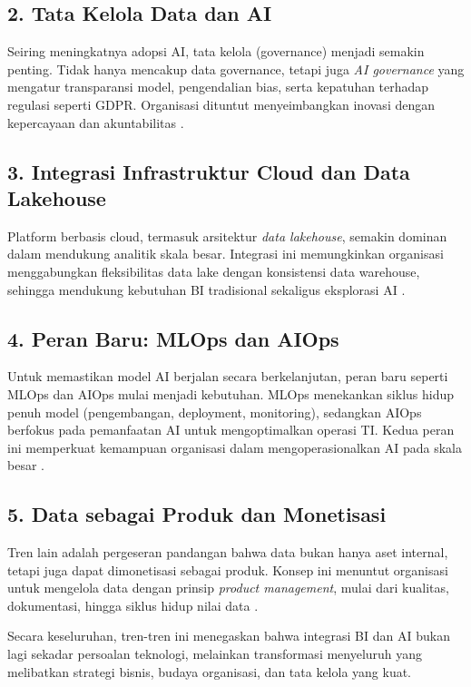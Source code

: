 \subsection*{2. Tata Kelola Data dan AI}
Seiring meningkatnya adopsi AI, tata kelola (governance) menjadi semakin penting. Tidak hanya mencakup 
data governance, tetapi juga \textit{AI governance} yang mengatur transparansi model, 
pengendalian bias, serta kepatuhan terhadap regulasi seperti GDPR. Organisasi dituntut menyeimbangkan 
inovasi dengan kepercayaan dan akuntabilitas \cite{khatri2010data, zwitter2014}.  

\subsection*{3. Integrasi Infrastruktur Cloud dan Data Lakehouse}
Platform berbasis cloud, termasuk arsitektur \textit{data lakehouse}, semakin dominan dalam mendukung 
analitik skala besar. Integrasi ini memungkinkan organisasi menggabungkan fleksibilitas data lake dengan 
konsistensi data warehouse, sehingga mendukung kebutuhan BI tradisional sekaligus eksplorasi AI 
\cite{armbrust2021lakehouse}.  

\subsection*{4. Peran Baru: MLOps dan AIOps}
Untuk memastikan model AI berjalan secara berkelanjutan, peran baru seperti MLOps dan AIOps mulai 
menjadi kebutuhan. MLOps menekankan siklus hidup penuh model (pengembangan, deployment, monitoring), 
sedangkan AIOps berfokus pada pemanfaatan AI untuk mengoptimalkan operasi TI. Kedua peran ini 
memperkuat kemampuan organisasi dalam mengoperasionalkan AI pada skala besar \cite{goyal2022}.  

\subsection*{5. Data sebagai Produk dan Monetisasi}
Tren lain adalah pergeseran pandangan bahwa data bukan hanya aset internal, tetapi juga dapat 
dimonetisasi sebagai produk. Konsep ini menuntut organisasi untuk mengelola data dengan prinsip 
\textit{product management}, mulai dari kualitas, dokumentasi, hingga siklus hidup nilai data 
\cite{labreuche2020}.  

Secara keseluruhan, tren-tren ini menegaskan bahwa integrasi BI dan AI bukan lagi sekadar 
persoalan teknologi, melainkan transformasi menyeluruh yang melibatkan strategi bisnis, 
budaya organisasi, dan tata kelola yang kuat.

